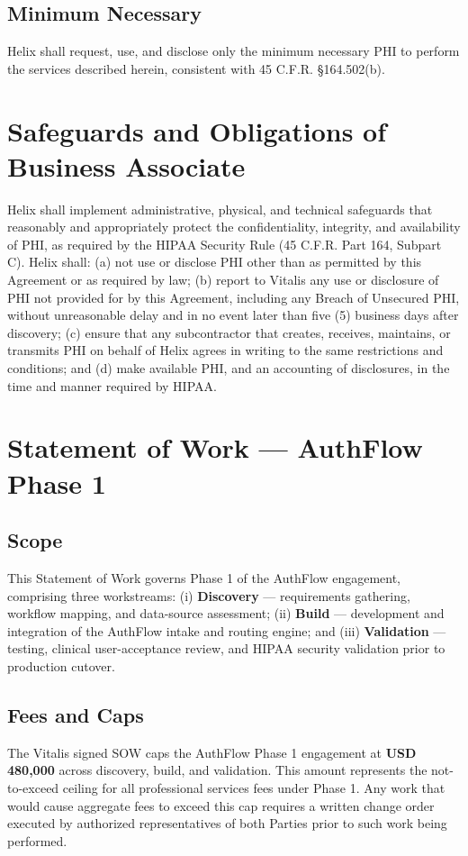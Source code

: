 \documentclass[11pt]{article}
\begin{document}
\subsection{Minimum Necessary}
Helix shall request, use, and disclose only the minimum necessary PHI to perform the services described herein, consistent with 45 C.F.R. \S 164.502(b).

\section{Safeguards and Obligations of Business Associate}

Helix shall implement administrative, physical, and technical safeguards that reasonably and appropriately protect the confidentiality, integrity, and availability of PHI, as required by the HIPAA Security Rule (45 C.F.R. Part 164, Subpart C). Helix shall: (a) not use or disclose PHI other than as permitted by this Agreement or as required by law; (b) report to Vitalis any use or disclosure of PHI not provided for by this Agreement, including any Breach of Unsecured PHI, without unreasonable delay and in no event later than five (5) business days after discovery; (c) ensure that any subcontractor that creates, receives, maintains, or transmits PHI on behalf of Helix agrees in writing to the same restrictions and conditions; and (d) make available PHI, and an accounting of disclosures, in the time and manner required by HIPAA.

\section{Statement of Work --- AuthFlow Phase 1}

\subsection{Scope}
This Statement of Work governs Phase 1 of the AuthFlow engagement, comprising three workstreams: (i) \textbf{Discovery} --- requirements gathering, workflow mapping, and data-source assessment; (ii) \textbf{Build} --- development and integration of the AuthFlow intake and routing engine; and (iii) \textbf{Validation} --- testing, clinical user-acceptance review, and HIPAA security validation prior to production cutover.

\subsection{Fees and Caps}
The Vitalis signed SOW caps the AuthFlow Phase 1 engagement at \textbf{USD 480,000} across discovery, build, and validation. This amount represents the not-to-exceed ceiling for all professional services fees under Phase 1. Any work that would cause aggregate fees to exceed this cap requires a written change order executed by authorized representatives of both Parties prior to such work being performed.
\end{document}
